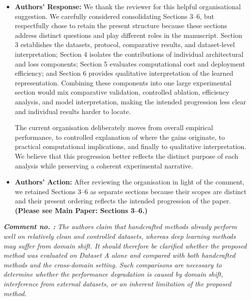 \documentclass[11pt]{article}
\theoremstyle{remark}
\newcounter{mycounter} %
\newcommand\showReviewcounter{\stepcounter{mycounter}\themycounter}
\begin{document}
\begin{itemize}
    \item \textbf{Authors' Response:}
    We thank the reviewer for this helpful organisational suggestion. We carefully considered consolidating Sections 3--6, but respectfully chose to retain the present structure because these sections address distinct questions and play different roles in the manuscript. Section 3 establishes the datasets, protocol, comparative results, and dataset-level interpretation; Section 4 isolates the contributions of individual architectural and loss components; Section 5 evaluates computational cost and deployment efficiency; and Section 6 provides qualitative interpretation of the learned representation. Combining these components into one large experimental section would mix comparative validation, controlled ablation, efficiency analysis, and model interpretation, making the intended progression less clear and individual results harder to locate.

    The current organisation deliberately moves from overall empirical performance, to controlled explanation of where the gains originate, to practical computational implications, and finally to qualitative interpretation. We believe that this progression better reflects the distinct purpose of each analysis while preserving a coherent experimental narrative.

    \item \textbf{Authors' Action:}
    After reviewing the organisation in light of the comment, we retained Sections 3--6 as separate sections because their scopes are distinct and their present ordering reflects the intended progression of the paper. \textbf{(Please see Main Paper: Sections 3--6.)}
\end{itemize}

\color{blue}
\textbf{\textit{Comment no. \showReviewcounter:}}
\textit{The authors claim that handcrafted methods already perform well on relatively clean and controlled datasets, whereas deep learning methods may suffer from domain shift. It should therefore be clarified whether the proposed method was evaluated on Dataset A alone and compared with both handcrafted methods and the cross-domain setting. Such comparisons are necessary to determine whether the performance degradation is caused by domain shift, interference from external datasets, or an inherent limitation of the proposed method.}
\color{black}
\end{document}
